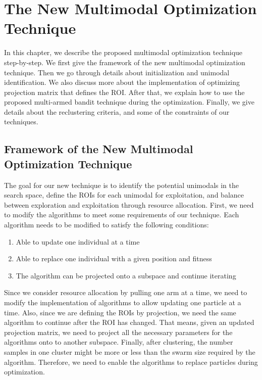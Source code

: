 \chapter{The New Multimodal Optimization Technique}
\label{chapter:new_bandit}

In this chapter, we describe the proposed multimodal optimization technique step-by-step. 
We first give the framework of the new multimodal optimization technique.
Then we go through details about initialization and unimodal identification.
We also discuss more about the implementation of optimizing projection matrix that defines the ROI.
After that, we explain how to use the proposed multi-armed bandit technique during the optimization.
Finally, we give details about the reclustering criteria, and some of the constraints of our techniques.


\section{Framework of the New Multimodal Optimization Technique}

The goal for our new technique is to identify the potential unimodals in the search space,
define the ROIs for each unimodal for exploitation,
and balance between exploration and exploitation through resource allocation.
First, we need to modify the algorithms to meet some requirements of our technique.
Each algorithm needs to be modified to satisfy the following conditions:
\begin{enumerate}
    \item Able to update one individual at a time 
    \item Able to replace one individual with a given position and fitness
    \item The algorithm can be projected onto a subspace and continue iterating 
\end{enumerate}

Since we consider resource allocation by pulling one arm at a time, 
we need to modify the implementation of algorithms to allow updating one particle at a time.
Also, since we are defining the ROIs by projection, we need the same algorithm to continue after the ROI has changed.
That means, given an updated projection matrix, 
we need to project all the necessary parameters for the algorithms onto to another subspace.
Finally, after clustering, the number samples in one cluster might be more or less than the swarm size required by the algorithm.
Therefore, we need to enable the algorithms to replace particles during optimization.

